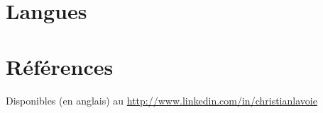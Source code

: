 \documentclass[10pt,letter,sans]{moderncv}   %
\begin{document}
\section{Langues}

\section{R\'{e}f\'{e}rences}
Disponibles (en anglais) au \url{http://www.linkedin.com/in/christianlavoie}

\null
\vfill

\makecvtitle


%
\end{document}
